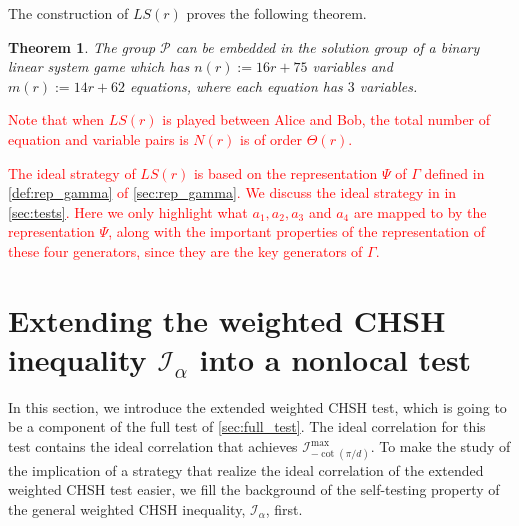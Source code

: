 \documentclass[11pt,letterpaper]{article}
\newcommand{\1}{\mathbb{1}}
\newcommand{\Pg}{\mathcal{P}}
\newcommand{\LS}{LS}
\newcommand{\nr}{n(r)}
\newcommand{\mr}{m(r)}
\newcommand{\I}{\mathcal{I}}
\newcommand{\hf}[1]{\textcolor{red}{#1}}
\newtheorem{theorem}{Theorem}[section]
\newtheorem{proposition}[theorem]{Proposition}
\theoremstyle{definition}
\begin{document}
The construction of $\LS(r)$ proves the following theorem.
\begin{theorem}
	The group $\Pg$ can be embedded in the solution group of a binary linear system game which has
	$\nr := 16r+75$ variables and $\mr := 14r + 62$ equations, where each equation has $3$ variables.
\end{theorem}
\hf{Note that when $\LS(r)$ is played between Alice and Bob, the total
number of equation and variable pairs is $N(r)$ is of order $\Theta(r)$.}

\hf{The ideal strategy of $\LS(r)$ is based on
the representation $\Psi$ of $\Gamma$ defined in \cref{def:rep_gamma}
of \cref{sec:rep_gamma}.
We discuss the ideal strategy in in \cref{sec:tests}.
Here we only highlight what $a_1, a_2, a_3$ and $a_4$ are mapped to by the representation $\Psi$, along
with the important properties of the representation of these four generators,
since they are the key generators of $\Gamma$.
}





\section{Extending the weighted CHSH inequality $\I_\alpha$ into a nonlocal test}
\label{sec:ext_chsh}
In this section, we introduce the extended weighted CHSH test,
which is going to be a component of the full test of \cref{sec:full_test}.
The ideal correlation for this test contains the ideal correlation that 
achieves $\I_{-\cot(\pi/d)}^{\max}$. 
To make the study of the implication of a strategy that realize 
the ideal correlation of the extended weighted CHSH test easier,
we fill the background of the self-testing property of the
general weighted CHSH inequality, $\I_\alpha$, first.
\end{document}

